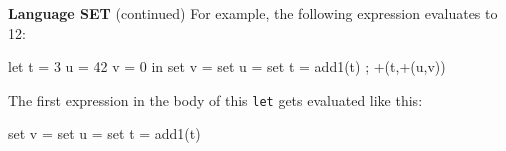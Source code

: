 \begin{minipage}[t]{\sw}
\slidenumber
\LARGE
{\bf Language SET} (continued)\exx
For example, the following expression evaluates to 12:
{\Large
\begin{qv}
let
  t = 3
  u = 42
  v = 0
in
  { set v = set u = set t = add1(t) ; +(t,+(u,v)) }
\end{qv}
}
The first expression in the body of this \verb'let'
gets evaluated like this:
{\Large
\begin{qv}
    set v = { set u = { set t = add1(t) } }
\end{qv}
}

\end{minipage}
\clearpage
